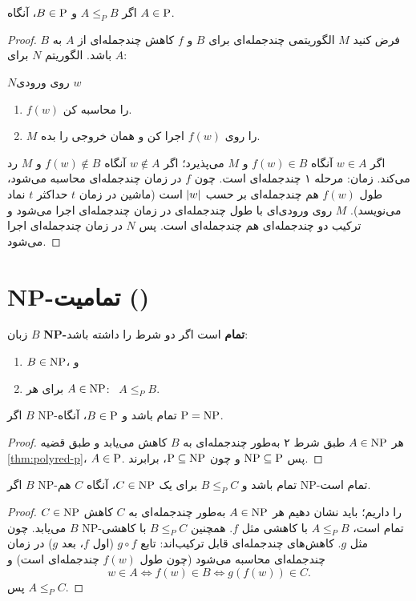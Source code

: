 \begin{theorem}\label{thm:polyred-p}
اگر $A\le_PB$ و $B\in\mathrm{P}$، آنگاه $A\in\mathrm{P}$.
\end{theorem}
\begin{proof}
فرض کنید $M$ الگوریتمی چندجمله‌ای برای $B$ و $f$ کاهش چندجمله‌ای از $A$ به $B$ باشد. الگوریتم $N$ برای $A$:
\begin{algo}{$N$}{روی ورودی $w$}
\begin{enumerate}
\item $f(w)$ را محاسبه کن.
\item $M$ را روی $f(w)$ اجرا کن و همان خروجی را بده.
\end{enumerate}
\end{algo}
اگر $w\in A$ آنگاه $f(w)\in B$ و $M$ می‌پذیرد؛ اگر $w\notin A$ آنگاه $f(w)\notin B$ و $M$ رد می‌کند. زمان: مرحله ۱ چندجمله‌ای است. چون $f$ در زمان چندجمله‌ای محاسبه می‌شود، طول $f(w)$ هم چندجمله‌ای بر حسب $\lvert w\rvert$ است (ماشین در زمان $t$ حداکثر $t$ نماد می‌نویسد). $M$ روی ورودی‌ای با طول چندجمله‌ای در زمان چندجمله‌ای اجرا می‌شود و ترکیب دو چندجمله‌ای هم چندجمله‌ای است. پس $N$ در زمان چندجمله‌ای اجرا می‌شود.
\end{proof}

\section{NP-تمامیت ()}

\begin{definition}[NP-تمام]
زبان $B$ \textbf{NP-تمام} است اگر دو شرط را داشته باشد:
\begin{enumerate}
\item $B\in\mathrm{NP}$، و
\item برای هر $A\in\mathrm{NP}$: \ $A\le_PB$.
\end{enumerate}
\end{definition}

\begin{theorem}
اگر $B$ NP-تمام باشد و $B\in\mathrm{P}$، آنگاه $\mathrm{P}=\mathrm{NP}$.
\end{theorem}
\begin{proof}
هر $A\in\mathrm{NP}$ طبق شرط ۲ به‌طور چندجمله‌ای به $B$ کاهش می‌یابد و طبق قضیه \ref{thm:polyred-p}، $A\in\mathrm{P}$. پس $\mathrm{NP}\subseteq\mathrm{P}$ و چون $\mathrm{P}\subseteq\mathrm{NP}$، برابرند.
\end{proof}

\begin{theorem}\label{thm:npc-chain}
اگر $B$ NP-تمام باشد و $B\le_PC$ برای یک $C\in\mathrm{NP}$، آنگاه $C$ هم NP-تمام است.
\end{theorem}
\begin{proof}
$C\in\mathrm{NP}$ را داریم؛ باید نشان دهیم هر $A\in\mathrm{NP}$ به‌طور چندجمله‌ای به $C$ کاهش می‌یابد. چون $B$ NP-تمام است، $A\le_PB$ با کاهشی مثل $f$. همچنین $B\le_PC$ با کاهشی مثل $g$. کاهش‌های چندجمله‌ای قابل ترکیب‌اند: تابع $g\circ f$ (اول $f$، بعد $g$) در زمان چندجمله‌ای محاسبه می‌شود (چون طول $f(w)$ چندجمله‌ای است) و
\[w\in A\iff f(w)\in B\iff g(f(w))\in C.\]
پس $A\le_PC$.
\end{proof}

